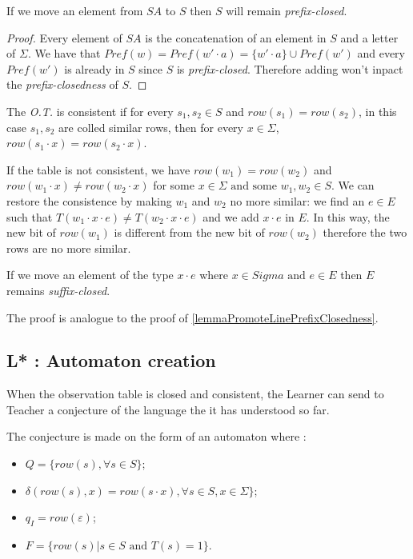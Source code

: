 \begin{lemma}
  \label{lemmaPromoteLinePrefixClosedness}
  If we move an element from $SA$ to $S$ then $S$ will remain \textit{prefix-closed}.
\end{lemma}

\begin{proof}
  Every element of $SA$ is the concatenation of an element in $S$ and a letter of $\Sigma$. We have that $Pref(w) = Pref(w' \cdot a) = \{w' \cdot a\} \cup Pref(w')$ and every $Pref(w')$ is already in $S$ since $S$ is \textit{prefix-closed}. Therefore adding \word{} won't inpact the \textit{prefix-closedness} of $S$.
\end{proof}

\begin{definition}[Consistence]
  The \textit{O.T.} is consistent if for every $s_1,s_2 \in S$ and $row(s_1) = row(s_2)$, in this case $s_1,s_2$ are colled similar rows, then for every $x \in \Sigma$, $row(s_1 \cdot x) = row(s_2 \cdot x)$.
\end{definition}

If the table is not consistent, we have $row(w_1) = row(w_2)$ and $row(w_1 \cdot x) \neq row(w_2 \cdot x)$ for some $x \in \Sigma \text{ and some }w_1, w_2 \in S$. We can restore the consistence by making $w_1$ and $w_2$ no more similar: we find an $e \in E$ such that $T(w_1 \cdot x \cdot e) \neq T(w_2 \cdot x \cdot e)$ and we add $x \cdot e$ in $E$. In this way, the new bit of $row(w_1)$ is different from the new bit of $row(w_2)$ therefore the two rows are no more similar.

\begin{lemma}
  If we move an element of the type $x \cdot e$ where $x \in Sigma \text{ and } e \in E$ then $E$ remains \textit{suffix-closed}.
\end{lemma}

The proof is analogue to the proof of \cref{lemmaPromoteLinePrefixClosedness}.

\subsection{L* : Automaton creation}

When the observation table is closed and consistent, the Learner can send to Teacher a conjecture of the language the it has understood so far.

The conjecture is made on the form of an automaton where :
\begin{itemize}
  \item $Q = \{row(s), \forall s \in S\}$;
  \item $\delta(row(s), x) = row(s \cdot x), \forall s \in S, x \in \Sigma\}$;
  \item $q_I = row(\varepsilon)$;
  \item $F = \{row(s) | s \in S \text{ and } T(s) = 1 \}$.
\end{itemize}

